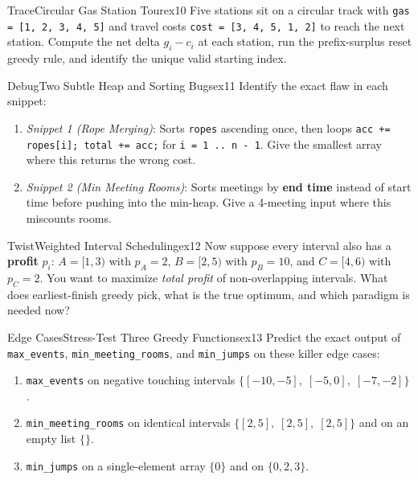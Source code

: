 \documentclass[11pt,a4paper]{article}
\theoremstyle{definition}
\begin{document}
\begin{tryitbox}{Trace}{Circular Gas Station Tour}{ex10}
Five stations sit on a circular track with \texttt{gas = [1, 2, 3, 4, 5]} and travel costs \texttt{cost = [3, 4, 5, 1, 2]} to reach the next station. Compute the net delta $g_i - c_i$ at each station, run the prefix-surplus reset greedy rule, and identify the unique valid starting index.
\end{tryitbox}

\begin{tryitbox}{Debug}{Two Subtle Heap and Sorting Bugs}{ex11}
Identify the exact flaw in each snippet:
\begin{enumerate}[itemsep=1pt, topsep=2pt]
    \item \emph{Snippet 1 (Rope Merging)}: Sorts \texttt{ropes} ascending once, then loops \texttt{acc += ropes[i]; total += acc;} for \texttt{i = 1 .. n - 1}. Give the smallest array where this returns the wrong cost.
    \item \emph{Snippet 2 (Min Meeting Rooms)}: Sorts meetings by \textbf{end time} instead of start time before pushing into the min-heap. Give a 4-meeting input where this miscounts rooms.
\end{enumerate}
\end{tryitbox}

\begin{tryitbox}{Twist}{Weighted Interval Scheduling}{ex12}
Now suppose every interval also has a \textbf{profit} $p_i$: $A = [1, 3)$ with $p_A = 2$, $B = [2, 5)$ with $p_B = 10$, and $C = [4, 6)$ with $p_C = 2$. You want to maximize \emph{total profit} of non-overlapping intervals. What does earliest-finish greedy pick, what is the true optimum, and which paradigm is needed now?
\end{tryitbox}

\begin{tryitbox}{Edge Cases}{Stress-Test Three Greedy Functions}{ex13}
Predict the exact output of \texttt{max\_events}, \texttt{min\_meeting\_rooms}, and \texttt{min\_jumps} on these killer edge cases:
\begin{enumerate}[itemsep=1pt, topsep=2pt]
    \item \texttt{max\_events} on negative touching intervals $\{[-10, -5],\; [-5, 0],\; [-7, -2]\}$.
    \item \texttt{min\_meeting\_rooms} on identical intervals $\{[2, 5],\; [2, 5],\; [2, 5]\}$ and on an empty list $\{\}$.
    \item \texttt{min\_jumps} on a single-element array $\{0\}$ and on $\{0, 2, 3\}$.
\end{enumerate}
\end{tryitbox}
\end{document}
